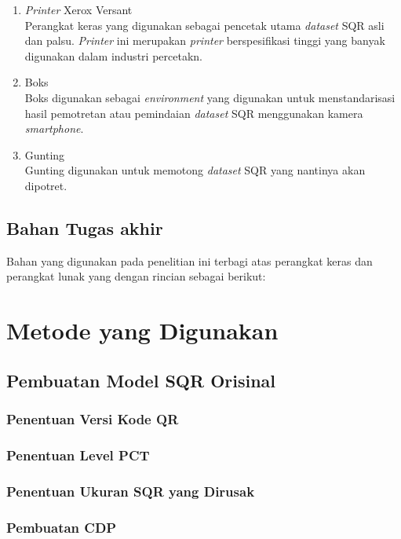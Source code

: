 \begin{enumerate}
	\item \emph{Printer} Xerox Versant\\Perangkat keras yang digunakan sebagai pencetak utama \emph{dataset} SQR asli dan palsu. \emph{Printer} ini merupakan \emph{printer} berspesifikasi tinggi yang banyak digunakan dalam industri percetakn.
	\item Boks\\Boks digunakan sebagai \emph{environment} yang digunakan untuk menstandarisasi hasil pemotretan atau pemindaian \emph{dataset} SQR menggunakan kamera \emph{smartphone}.
	\item Gunting\\Gunting digunakan untuk memotong \emph{dataset} SQR yang nantinya akan dipotret.
\end{enumerate}

\subsection{Bahan Tugas akhir}

Bahan yang digunakan pada penelitian ini terbagi atas perangkat keras dan perangkat lunak yang dengan rincian sebagai berikut:

\section{Metode yang Digunakan}

\subsection{Pembuatan Model SQR Orisinal}

\subsubsection{Penentuan Versi Kode QR}

\subsubsection{Penentuan Level PCT}

\subsubsection{Penentuan Ukuran SQR yang Dirusak}

\subsubsection{Pembuatan CDP}

